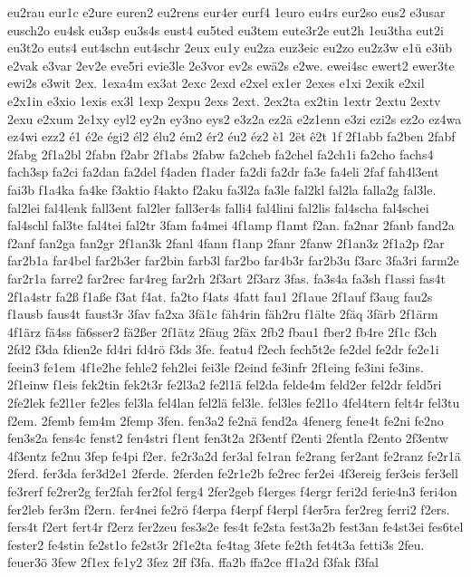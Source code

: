 {eu2rau
eur1c
e2ure
euren2
eu2rens
eur4er
eurf4
1euro
eu4rs
eur2so
eus2
e3usar
eusch2o
eu4sk
eu3sp
eu3s4s
eust4
eu5ted
eu3tem
eute3r2e
eut2h
1eu3tha
eut2i
eu3t2o
euts4
eut4schn
eut4schr
2eux
eu1y
eu2za
euz3eic
eu2zo
eu2z3w
e1ü
e3üb
e2vak
e3var
2ev2e
eve5ri
evie3le
2e3vor
ev2s
ewä2s
e2we.
ewei4sc
ewert2
ewer3te
ewi2s
e3wit
2ex.
1exa4m
ex3at
2exc
2exd
e2xel
ex1er
2exes
e1xi
2exik
e2xil
e2x1in
e3xio
1exis
ex3l
1exp
2expu
2exs
2ext.
2ex2ta
ex2tin
1extr
2extu
2extv
2exu
e2xum
2e1xy
eyl2
ey2n
ey3no
eys2
e3z2a
ez2ä
e2z1enn
e3zi
ezi2s
ez2o
ez4wa
ez4wi
ezz2
é1
é2e
égi2
él2
élu2
ém2
ér2
éu2
éz2
è1
2ët
ê2t
1f
2f1abb
fa2ben
2fabf
2fabg
2f1a2bl
2fabn
f2abr
2f1abs
2fabw
fa2cheb
fa2chel
fa2ch1i
fa2cho
fachs4
fach3sp
fa2ci
fa2dan
fa2del
f4aden
f1ader
fa2di
fa2dr
fa3e
fa4eli
2faf
fah4l3ent
fai3b
f1a4ka
fa4ke
f3aktio
f4akto
f2aku
fa3l2a
fa3le
fal2kl
fal2la
falla2g
fal3le.
fal2lei
fal4lenk
fall3ent
fal2ler
fall3er4s
falli4
fal4lini
fal2lis
fal4scha
fal4schei
fal4schl
fal3te
fal4tei
fal2tr
3fam
fa4mei
4f1amp
f1amt
f2an.
fa2nar
2fanb
fand2a
f2anf
fan2ga
fan2gr
2f1an3k
2fanl
4fann
f1anp
2fanr
2fanw
2f1an3z
2f1a2p
f2ar
far2b1a
far4bel
far2b3er
far2bin
farb3l
far2bo
far4b3r
far2b3u
f3arc
3fa3ri
farm2e
far2r1a
farre2
far2rec
far4reg
far2rh
2f3art
2f3arz
3fas.
fa3s4a
fa3sh
f1assi
fas4t
2f1a4str
fa2ß
f1aße
f3at
f4at.
fa2to
f4ats
4fatt
fau1
2f1aue
2f1auf
f3aug
fau2s
f1ausb
faus4t
faust3r
3fav
fa2xa
3fä1c
fäh4rin
fäh2ru
f1älte
2fäq
3färb
2f1ärm
4f1ärz
fä4ss
fä6sser2
fä2ßer
2f1ätz
2fäug
2fäx
2fb2
fbau1
fber2
fb4re
2f1c
f3ch
2fd2
f3da
fdien2e
fd4ri
fd4rö
f3ds
3fe.
featu4
f2ech
fech5t2e
fe2del
fe2dr
fe2e1i
feein3
fe1em
4f1e2he
fehle2
feh2lei
fei3le
f2eind
fe3infr
2f1eing
fe3ini
fe3ins.
2f1einw
f1eis
fek2tin
fek2t3r
fe2l3a2
fe2l1ä
fel2da
felde4m
feld2er
fel2dr
feld5ri
2fe2lek
fe2l1er
fe2les
fel3la
fel4lan
fel2lä
fel3le.
fel3les
fe2l1o
4fel4tern
felt4r
fel3tu
f2em.
2femb
fem4m
2femp
3fen.
fen3a2
fe2nä
fend2a
4fenerg
fene4t
fe2ni
fe2no
fen3s2a
fens4c
fenst2
fen4stri
f1ent
fen3t2a
2f3entf
f2enti
2fentla
f2ento
2f3entw
4f3entz
fe2nu
3fep
fe4pi
f2er.
fe2r3a2d
fer3al
fe1ran
fe2rang
fer2ant
fe2ranz
fe2r1ä
2ferd.
fer3da
fer3d2e1
2ferde.
2ferden
fe2r1e2b
fe2rec
fer2ei
4f3ereig
fer3eis
fer3ell
fe3rerf
fe2rer2g
fer2fah
fer2fol
ferg4
2fer2geb
f4erges
f4ergr
feri2d
ferie4n3
feri4on
fer2leb
fer3m
f2ern.
fer4nei
fe2rö
f4erpa
f4erpf
f4erpl
f4er5ra
fer2reg
ferri2
f2ers.
fers4t
f2ert
fert4r
f2erz
fer2zeu
fes3s2e
fes4t
fe2sta
fest3a2b
fest3an
fe4st3ei
fes6tel
fester2
fe4stin
fe2st1o
fe2st3r
2f1e2ta
fe4tag
3fete
fe2th
fet4t3a
fetti3s
2feu.
feuer3ö
3few
2f1ex
fe1y2
3fez
2ff
f3fa.
ffa2b
ffa2ce
ff1a2d
f3fak
f3fal
}
